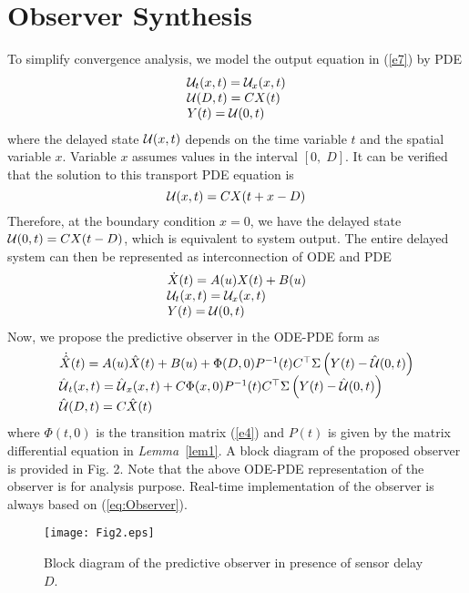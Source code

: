 \documentclass[12pt,draftcls,onecolumn]{IEEEtran}
\begin{document}
\section{Observer Synthesis}

To simplify convergence analysis, we model the output equation in (\ref{e7}) by PDE
\begin{equation}  \label{e9}
\begin{array}{l}
{{\cal U}_t}(x,t) = {{\cal U}_x}(x,t)\\
{\cal U}(D,t) = CX(t)\\
Y(t) = {\cal U}(0,t)
\end{array}
\end{equation}
where the delayed state ${\cal U}(x,t)$ depends on the time variable $t$ and the spatial variable $x$. Variable $x$ assumes values in the interval $\left[ {0,\;D} \right]$.
It can be verified that the solution to this transport PDE equation is
\begin{equation} \label{defu}
{\cal U}(x,t) = CX(t + x - D)
\end{equation}
Therefore, at the boundary condition $x = 0$, we have the delayed state ${\cal U}(0,t) = CX(t - D)$, which is equivalent to system output.
The entire delayed system can then be represented as interconnection of ODE and PDE
\begin{equation} \label{e10}
\begin{array}{l}
\dot X(t) = A(u)X(t) + B(u)\\
{{\cal U}_t}(x,t) = {{\cal U}_x}(x,t)\\
Y(t) = {\cal U}(0,t)
\end{array}
\end{equation}
Now, we propose the predictive observer in the ODE-PDE form as
\begin{equation}    \label{e11}
 \begin{array}{l}
\dot{\hat {X}}(t) = A(u)\hat X(t) + B(u) + \Phi (D,0){P^{ - 1}}(t){C^{\top} }{\rm{\Sigma }}\left( {Y(t) - \hat {\cal U}(0,t)} \right)\\
{{\hat {\cal U}}_t}(x,t) = {{\hat {\cal U}}_x}(x,t) + C\Phi (x,0){P^{ - 1}}(t){C^{\top} }{\rm{\Sigma }}\left( {Y(t) - \hat {\cal U}(0,t)} \right)\\
\hat {\cal U}(D,t) = C\hat X(t)
\end{array}
\end{equation}
where $\Phi(t,0)$ is the transition matrix (\ref{e4}) and $P(t)$ is given by the matrix differential equation in \textit{Lemma}~\ref{lem1}. A block diagram of the proposed observer is provided in Fig. 2. Note that the above ODE-PDE representation of the observer is for analysis purpose. Real-time implementation of the observer is always based on (\ref{eq:Observer}).
\begin{figure}[thpb] \label{F2}
\centering
\texttt{[image: Fig2.eps]}
\caption{Block diagram of the predictive observer in presence of sensor delay $D$.}
\end{figure}
\end{document}

